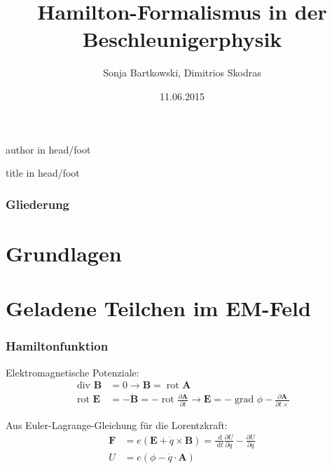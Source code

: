 \documentclass[hyperref={pdfpagelabels=false}]{beamer}
\title{Hamilton-Formalismus in der Beschleunigerphysik}
\institute{
Technische Universit\"at Dortmund}
\author{Sonja Bartkowski, Dimitrios Skodras}
\date{11.06.2015}
\newcommand {\rot} {\; \mathrm{rot} \,}         %
\newcommand {\grad} {\; \mathrm{grad} \,}       %
\newcommand {\dive} {\; \mathrm{div} \,}        %
\newcommand {\dx} {\; \mathrm{d} }              %
\begin{document}
{%
  \leavevmode%
 \begin{beamercolorbox}%
    [wd=.5\paperwidth,ht=2.5ex,dp=1.125ex,leftskip=.3cm,rightskip=.3cm]%
    {author in head/foot}%
    \hfill\insertshortauthor
  \end{beamercolorbox}%
  \begin{beamercolorbox}%
    [wd=.5\paperwidth,ht=2.5ex,dp=1.125ex,leftskip=.3cm ,rightskip=.3cm]%
    {title in head/foot}%
    \insertshorttitle\hfill\insertframenumber{}
  \end{beamercolorbox}%
}%

\captionsetup[figure]{font=small,skip=0pt}
\begin{frame}
\titlepage
\end{frame} 

\begin{frame}
\frametitle{Gliederung}
\tableofcontents
\end{frame} 

\newcommand{\tmotiv}{Grundlagen}
\section{\tmotiv}
\begin{frame} 

 \end{frame}


\section{Geladene Teilchen im EM-Feld}
\begin{frame}
 \frametitle{Hamiltonfunktion}
 \pause
 Elektromagnetische Potenziale:
 \begin{align*}
  \dive\, \mathbf{ B} &= 0 \rightarrow \mathbf{B} = \rot\, \mathbf{A}\\
  \rot\,\mathbf{ E}  &= -\dot {\mathbf{B}} = -\rot\, \frac{\partial\mathbf{A}}{\partial t} \rightarrow \mathbf{E} = -\grad\,\phi - \frac{\partial\mathbf{A}}{\partial t×}
 \end{align*}
 
 Aus Euler-Lagrange-Gleichung für die Lorentzkraft: 
 \begin{align*}
   \mathbf{F} &= e(\mathbf{E} + \dot {q}\times \mathbf{B}) = \frac{\dx}{\dx t} \frac{\partial U}{\partial \dot {q}} - \frac{\partial U}{\partial q}\\
   U &= e(\phi - \dot{q}\cdot\mathbf{A})
 \end{align*}
 
\end{frame}
\end{document}
